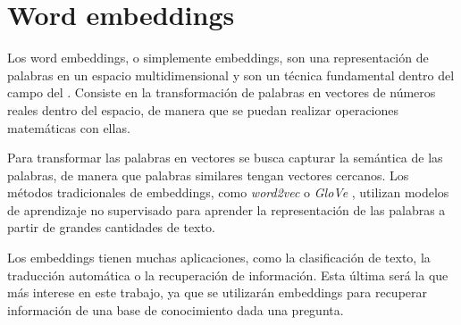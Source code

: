 \section{Word embeddings}
Los word embeddings, o simplemente embeddings, son una representación de palabras en un espacio multidimensional y son un técnica fundamental dentro del campo del . Consiste en la transformación de palabras en vectores de números reales dentro del espacio, de manera que se puedan realizar operaciones matemáticas con ellas.

Para transformar las palabras en vectores se busca capturar la semántica de las palabras, de manera que palabras similares tengan vectores cercanos. Los métodos tradicionales de embeddings, como \textit{word2vec} \cite{mikolov2013efficient} o \textit{GloVe} \cite{pennington2014glove}, utilizan modelos de aprendizaje no supervisado para aprender la representación de las palabras a partir de grandes cantidades de texto.

Los embeddings tienen muchas aplicaciones, como la clasificación de texto, la traducción automática o la recuperación de información. Esta última será la que más interese en este trabajo, ya que se utilizarán embeddings para recuperar información de una base de conocimiento dada una pregunta.